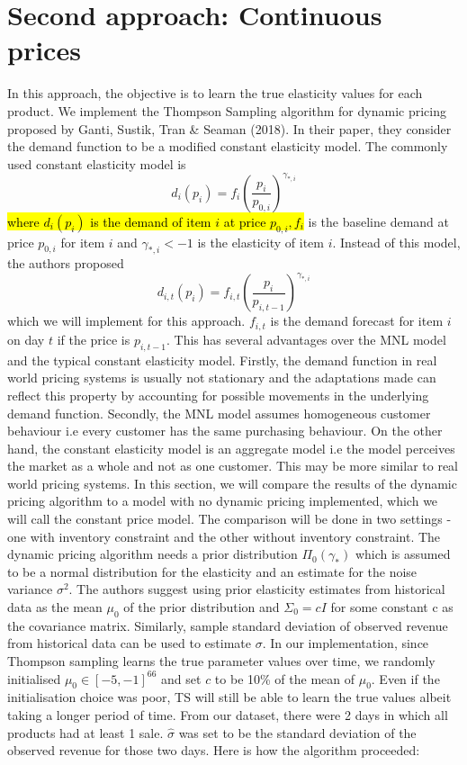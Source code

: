 \documentclass[a4paper]{article}
\begin{document}
\section{Second approach: Continuous prices}
In this approach, the objective is to learn the true elasticity values for each product. We implement the Thompson Sampling algorithm for dynamic pricing proposed by Ganti, Sustik, Tran \& Seaman (2018). In their paper, they consider the demand function to be a modified constant elasticity model. The commonly used constant elasticity model is 
\[d_i(p_i) = f_i \left(\frac{p_i}{p_{0,i}}\right)^{\gamma_{*,i}} \]
\hl{where $d_i(p_i)$ is the demand of item $i$ at price $p_{0,i}, f_i$ } is the baseline demand at price $p_{0,i}$ for item $i$ and $\gamma_{*,i} < -1$ is the elasticity of item $i$. Instead of this model, the authors proposed 
\[d_{i,t}(p_i) = f_{i,t} \left(\frac{p_i}{p_{i,t-1}}\right)^{\gamma_{*,i}} \]
which we will implement for this approach. $f_{i,t}$ is the demand forecast for item $i$ on day $t$ if the price is $p_{i,t-1}$. This has several advantages over the MNL model and the typical constant elasticity model. Firstly, the demand function in real world pricing systems is usually not stationary and the adaptations made can reflect this property by accounting for possible movements in the underlying demand function. Secondly, the MNL model assumes homogeneous customer behaviour i.e every customer has the same purchasing behaviour. On the other hand, the constant elasticity model is an aggregate model i.e the model perceives the market as a whole and not as one customer. This may be more similar to real world pricing systems.
\newline
\newline
In this section, we will compare the results of the dynamic pricing algorithm to a model with no dynamic pricing implemented, which we will call the constant price model. The comparison will be done in two settings - one with inventory constraint and the other without inventory constraint.
\newline
\newline
The dynamic pricing algorithm needs a prior distribution $\Pi_0(\gamma_*)$ which is assumed to be a normal distribution for the elasticity and an estimate for the noise variance $\sigma^2$. The authors suggest using prior elasticity estimates from historical data as the mean $\mu_0$ of the prior distribution and $\Sigma_0 = cI$ for some constant c as the covariance matrix. Similarly, sample standard deviation of observed revenue from historical data can be used to estimate $\sigma$. In our implementation, since Thompson sampling learns the true parameter values over time, we randomly initialised $\mu_0 \in [-5, -1]^{66}$ and set $c$ to be 10\% of the mean of $\mu_0$. Even if the initialisation choice was poor, TS will still be able to learn the true values albeit taking a longer period of time. From our dataset, there were 2 days in which all products had at least 1 sale. $\hat{\sigma}$ was set to be the standard deviation of the observed revenue for those two days. Here is how the algorithm proceeded:
\end{document}
